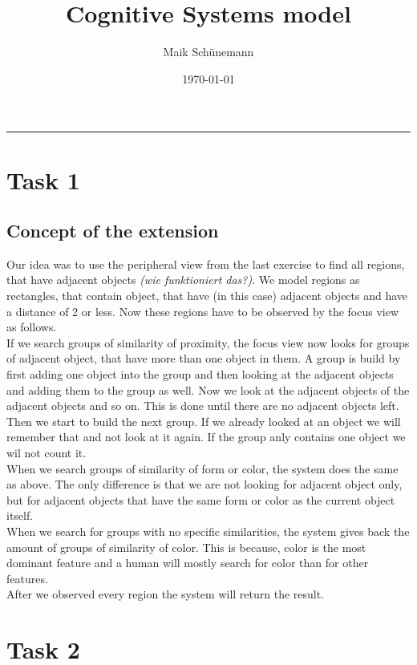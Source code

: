 \documentclass[11pt,a4paper,oneside]{scrartcl}
\author{Maik Schünemann}
\date{\today}
\title{Cognitive Systems model}
\begin{document}
\maketitle
\tableofcontents


\rule{\linewidth}{0.5pt}

\section{Task 1}
\subsection{Concept of the extension}
Our idea was to use the peripheral view from the last exercise to find all regions, that have adjacent objects \textit{(wie funktioniert das?)}. We model regions as rectangles, that contain object, that have (in this case) adjacent objects and have a distance of 2 or less. Now these regions have to be observed by the focus view as follows.\\
If we search groups of similarity of proximity, the focus view now looks for groups of adjacent object, that have more than one object in them. A group is build by first adding one object into the group and then looking at the adjacent objects and adding them to the group as well. Now we look at the adjacent objects of the adjacent objects and so on. This is done until there are no adjacent objects left. Then we start to build the next group. If we already looked at an object we will remember that and not look at it again. If the group anly contains one object we wil not count it.\\
When we search groups of similarity of form or color, the system does the same as above. The only difference is that we are not looking for adjacent object only, but for adjacent objects that have the same form or color as the current object itself.\\
When we search for groups with no specific similarities, the system gives back the amount of groups of similarity of color. This is because, color is the most dominant feature and a human will mostly search for color than for other features.\\
After we observed every region the system will return the result.
\section{Task 2}
\end{document}
